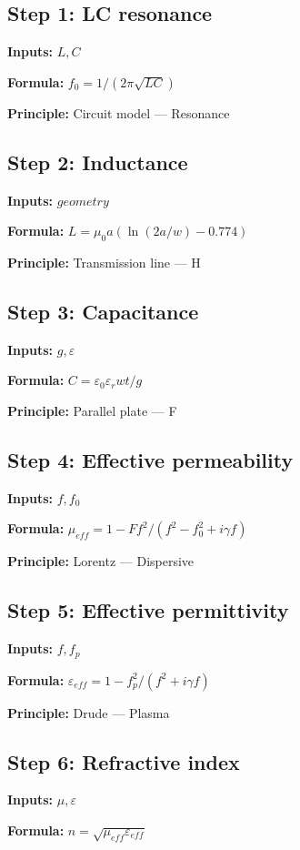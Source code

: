 \documentclass[11pt,twocolumn]{article}
\begin{document}
\subsection*{Step 1: LC resonance}
\textbf{Inputs:} $L, C$

\textbf{Formula:} $f_0 = 1/(2\pi\sqrt{LC})$

\textbf{Principle:} Circuit model --- Resonance

\subsection*{Step 2: Inductance}
\textbf{Inputs:} $geometry$

\textbf{Formula:} $L = \mu_0 a (\ln(2a/w) - 0.774)$

\textbf{Principle:} Transmission line --- H

\subsection*{Step 3: Capacitance}
\textbf{Inputs:} $g, \varepsilon$

\textbf{Formula:} $C = \varepsilon_0 \varepsilon_r w t / g$

\textbf{Principle:} Parallel plate --- F

\subsection*{Step 4: Effective permeability}
\textbf{Inputs:} $f, f_0$

\textbf{Formula:} $\mu_{eff} = 1 - F f^2/(f^2 - f_0^2 + i\gamma f)$

\textbf{Principle:} Lorentz --- Dispersive

\subsection*{Step 5: Effective permittivity}
\textbf{Inputs:} $f, f_p$

\textbf{Formula:} $\varepsilon_{eff} = 1 - f_p^2/(f^2 + i\gamma f)$

\textbf{Principle:} Drude --- Plasma

\subsection*{Step 6: Refractive index}
\textbf{Inputs:} $\mu, \varepsilon$

\textbf{Formula:} $n = \sqrt{\mu_{eff} \varepsilon_{eff}}$
\end{document}
